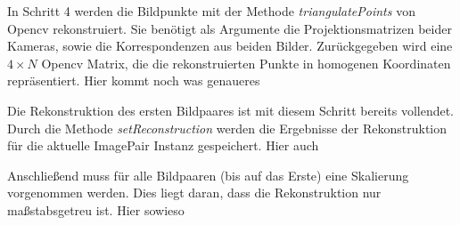 In Schritt 4 werden die Bildpunkte mit der Methode \emph{triangulatePoints} von Opencv rekonstruiert.
Sie benötigt als Argumente die Projektionsmatrizen beider Kameras, sowie die Korrespondenzen aus beiden Bilder.  
Zurückgegeben wird eine $4\times N$ Opencv Matrix, die die rekonstruierten Punkte in homogenen Koordinaten repräsentiert.
Hier kommt noch was genaueres

Die Rekonstruktion des ersten Bildpaares ist mit diesem Schritt bereits vollendet.
Durch die Methode \emph{setReconstruction} werden die Ergebnisse der Rekonstruktion für die aktuelle ImagePair Instanz gespeichert.
Hier auch

Anschließend muss für alle Bildpaaren (bis auf das Erste) eine Skalierung vorgenommen werden.
Dies liegt daran, dass die Rekonstruktion nur maßstabsgetreu ist.
Hier sowieso
